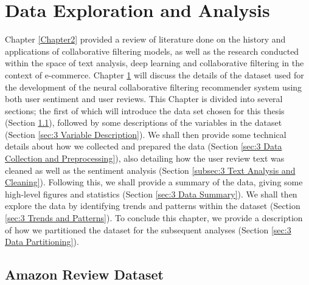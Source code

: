 \chapter{Data Exploration and Analysis} %

\label{Chapter3} %

Chapter \ref{Chapter2} provided a review of literature done on the history and applications of collaborative filtering models, as well as the research conducted within the space of text analysis, deep learning and collaborative filtering in the context of e-commerce. Chapter \ref{Chapter3} will discuss the details of the dataset used for the development of the neural collaborative filtering recommender system using both user sentiment and user reviews. This Chapter is divided into several sections; the first of which will introduce the data set chosen for this thesis (Section \ref{subsec:3 Amazon Review Dataset}), followed by some descriptions of the variables in the dataset (Section \ref{sec:3 Variable Description}). We shall then provide some technical details about how we collected and prepared the data (Section \ref{sec:3 Data Collection and Preprocessing}), also detailing how the user review text was cleaned as well as the sentiment analysis (Section \ref{subsec:3 Text Analysis and Cleaning}). Following this, we shall provide a summary of the data, giving some high-level figures and statistics (Section \ref{sec:3 Data Summary}). We shall then explore the data by identifying trends and patterns within the dataset (Section \ref{sec:3 Trends and Patterns}). To conclude this chapter, we provide a description of how we partitioned the dataset for the subsequent analyses (Section \ref{sec:3 Data Partitioning}). 

\section{Amazon Review Dataset}
\label{subsec:3 Amazon Review Dataset}

